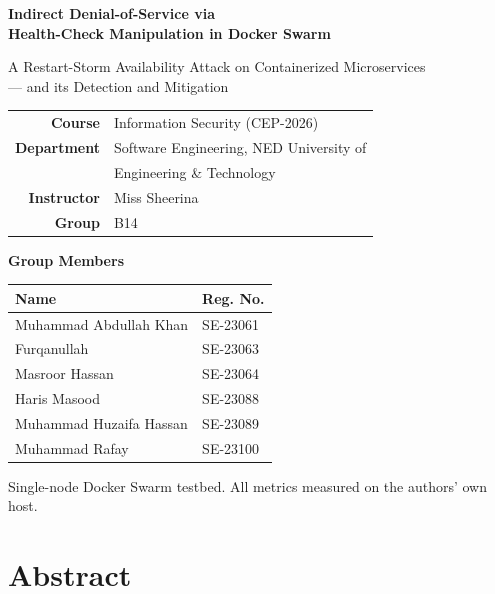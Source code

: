 \documentclass[11pt]{article}
\begin{document}
\begin{titlepage}
\centering
\vspace*{1.5cm}
{\LARGE\bfseries Indirect Denial-of-Service via\\[2pt] Health-Check Manipulation in Docker Swarm\par}
\vspace{0.6cm}
{\large A Restart-Storm Availability Attack on Containerized Microservices\\ --- and its Detection and Mitigation\par}
\vspace{1.4cm}

\begin{tabular}{rl}
\textbf{Course} & Information Security (CEP-2026)\\[3pt]
\textbf{Department} & Software Engineering, NED University of\\
                   & Engineering \& Technology\\[3pt]
\textbf{Instructor} & Miss Sheerina\\[3pt]
\textbf{Group} & B14\\
\end{tabular}

\vspace{1.0cm}
{\large\bfseries Group Members\par}
\vspace{0.3cm}
\begin{tabular}{ll}
\toprule
\textbf{Name} & \textbf{Reg. No.}\\
\midrule
Muhammad Abdullah Khan & SE-23061\\
Furqanullah & SE-23063\\
Masroor Hassan & SE-23064\\
Haris Masood & SE-23088\\
Muhammad Huzaifa Hassan & SE-23089\\
Muhammad Rafay & SE-23100\\
\bottomrule
\end{tabular}

\vfill
{\small Single-node Docker Swarm testbed. All metrics measured on the authors' own host.\par}
\end{titlepage}

\tableofcontents
\newpage

\section*{Abstract}
\end{document}
